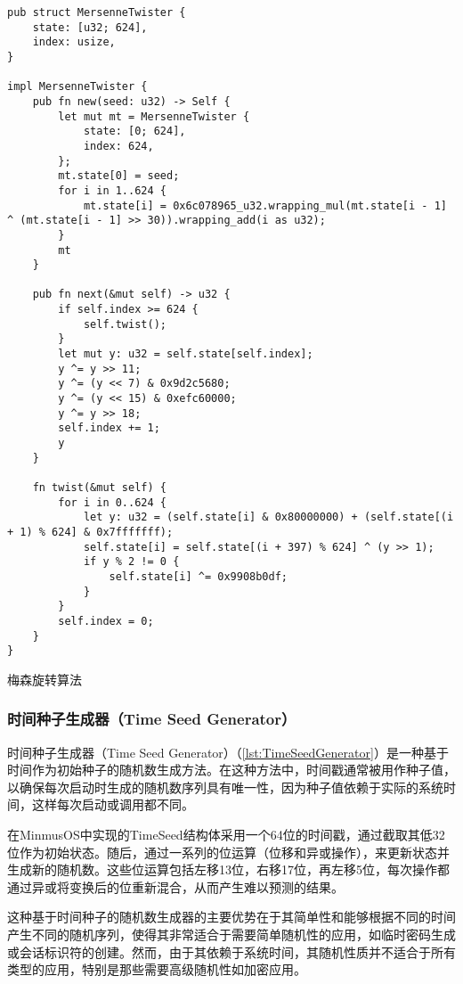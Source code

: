 \begin{listing}[htbp]
    \begin{verbatim}
pub struct MersenneTwister {
    state: [u32; 624],
    index: usize,
}

impl MersenneTwister {
    pub fn new(seed: u32) -> Self {
        let mut mt = MersenneTwister {
            state: [0; 624],
            index: 624,
        };
        mt.state[0] = seed;
        for i in 1..624 {
            mt.state[i] = 0x6c078965_u32.wrapping_mul(mt.state[i - 1] ^ (mt.state[i - 1] >> 30)).wrapping_add(i as u32);
        }
        mt
    }

    pub fn next(&mut self) -> u32 {
        if self.index >= 624 {
            self.twist();
        }
        let mut y: u32 = self.state[self.index];
        y ^= y >> 11;
        y ^= (y << 7) & 0x9d2c5680;
        y ^= (y << 15) & 0xefc60000;
        y ^= y >> 18;
        self.index += 1;
        y
    }

    fn twist(&mut self) {
        for i in 0..624 {
            let y: u32 = (self.state[i] & 0x80000000) + (self.state[(i + 1) % 624] & 0x7fffffff);
            self.state[i] = self.state[(i + 397) % 624] ^ (y >> 1);
            if y % 2 != 0 {
                self.state[i] ^= 0x9908b0df;
            }
        }
        self.index = 0;
    }
}
    \end{verbatim}
    \caption{梅森旋转算法}\label{lst:MersenneTwister}
\end{listing}

\subsubsection{时间种子生成器（Time Seed Generator）}

时间种子生成器（Time Seed Generator）（\cref{lst:TimeSeedGenerator}）是一种基于时间作为初始种子的随机数生成方法。在这种方法中，时间戳通常被用作种子值，以确保每次启动时生成的随机数序列具有唯一性，因为种子值依赖于实际的系统时间，这样每次启动或调用都不同。

在MinmusOS中实现的TimeSeed结构体采用一个64位的时间戳，通过截取其低32位作为初始状态。随后，通过一系列的位运算（位移和异或操作），来更新状态并生成新的随机数。这些位运算包括左移13位，右移17位，再左移5位，每次操作都通过异或将变换后的位重新混合，从而产生难以预测的结果。

这种基于时间种子的随机数生成器的主要优势在于其简单性和能够根据不同的时间产生不同的随机序列，使得其非常适合于需要简单随机性的应用，如临时密码生成或会话标识符的创建。然而，由于其依赖于系统时间，其随机性质并不适合于所有类型的应用，特别是那些需要高级随机性如加密应用。

